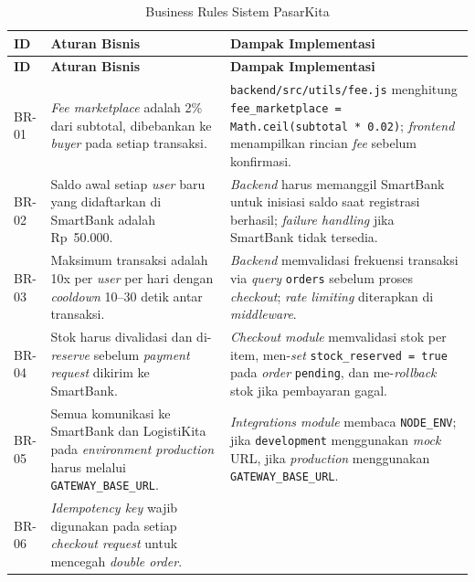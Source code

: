 \begin{longtable}{|L{1cm}|L{7cm}|L{7cm}|}
    \caption{Business Rules Sistem PasarKita}
    \label{tab:business-rules} \\
    \hline
    \textbf{ID} & \textbf{Aturan Bisnis} & \textbf{Dampak Implementasi} \\
    \hline
    \endfirsthead
    \hline
    \textbf{ID} & \textbf{Aturan Bisnis} & \textbf{Dampak Implementasi} \\
    \hline
    \endhead
    \hline
    \endfoot
    BR-01
        & \textit{Fee marketplace} adalah 2\% dari subtotal, dibebankan ke
          \textit{buyer} pada setiap transaksi.
        & \texttt{backend/src/utils/fee.js} menghitung
          \texttt{fee\_marketplace = Math.ceil(subtotal * 0.02)};
          \textit{frontend} menampilkan rincian \textit{fee} sebelum konfirmasi. \\
    \hline
    BR-02
        & Saldo awal setiap \textit{user} baru yang didaftarkan di SmartBank
          adalah Rp~50.000.
        & \textit{Backend} harus memanggil SmartBank untuk inisiasi saldo saat
          registrasi berhasil; \textit{failure handling} jika SmartBank tidak
          tersedia. \\
    \hline
    BR-03
        & Maksimum transaksi adalah 10x per \textit{user} per hari dengan
          \textit{cooldown} 10--30 detik antar transaksi.
        & \textit{Backend} memvalidasi frekuensi transaksi via \textit{query}
          \texttt{orders} sebelum proses \textit{checkout}; \textit{rate limiting}
          diterapkan di \textit{middleware}. \\
    \hline
    BR-04
        & Stok harus divalidasi dan di-\textit{reserve} sebelum \textit{payment
          request} dikirim ke SmartBank.
        & \textit{Checkout module} memvalidasi stok per item, men-\textit{set}
          \texttt{stock\_reserved = true} pada \textit{order} \texttt{pending},
          dan me-\textit{rollback} stok jika pembayaran gagal. \\
    \hline
    BR-05
        & Semua komunikasi ke SmartBank dan LogistiKita pada \textit{environment
          production} harus melalui \texttt{GATEWAY\_BASE\_URL}.
        & \textit{Integrations module} membaca \texttt{NODE\_ENV}; jika
          \texttt{development} menggunakan \textit{mock} URL, jika
          \textit{production} menggunakan \texttt{GATEWAY\_BASE\_URL}. \\
    \hline
    BR-06
        & \textit{Idempotency key} wajib digunakan pada setiap \textit{checkout
          request} untuk mencegah \textit{double order}.

\end{longtable}
